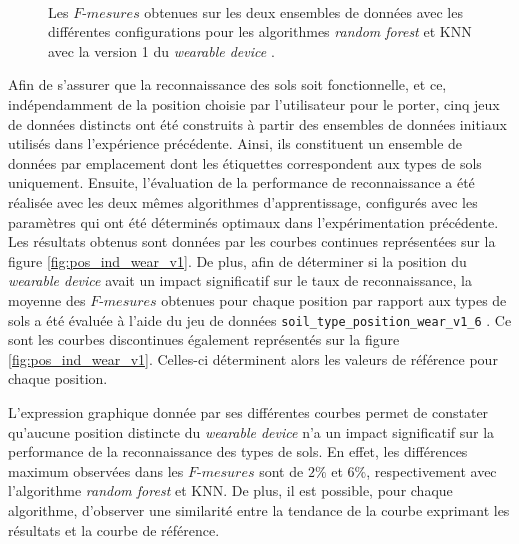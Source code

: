 \begin{figure}[H]
    \centering
    \\[20pt]
    \caption[Les $F\mbox{-} mesures$ obtenues sur les deux ensembles de données avec les différentes configurations pour les algorithmes \textit{random forest} et \acs{KNN} avec la version 1 du \textit{wearable device}.]{Les $F\mbox{-} mesures$ obtenues sur les deux ensembles de données avec les différentes configurations pour les algorithmes \textit{random forest} et \acs{KNN} avec la version 1 du \textit{wearable device} \citep{Thullier2017}.}
    \label{fig:results_wear_v1}
\end{figure}

Afin de s'assurer que la reconnaissance des sols soit fonctionnelle, et ce, indépendamment de la position choisie par l'utilisateur pour le porter, cinq jeux de données distincts ont été construits à partir des ensembles de données initiaux utilisés dans l'expérience précédente. Ainsi, ils constituent un ensemble de données par emplacement dont les étiquettes correspondent aux types de sols uniquement. Ensuite, l'évaluation de la performance de reconnaissance a été réalisée avec les deux mêmes algorithmes d'apprentissage, configurés avec les paramètres qui ont été déterminés optimaux dans l'expérimentation précédente. Les résultats obtenus sont données par les courbes continues représentées sur la figure \ref{fig:pos_ind_wear_v1}. De plus, afin de déterminer si la position du \textit{wearable device} avait un impact significatif sur le taux de reconnaissance, la moyenne des $F\mbox{-}mesures$ obtenues pour chaque position par rapport aux types de sols a été évaluée à l'aide du jeu de données \og \texttt{soil\_type\_position\_wear\_v1\_6} \fg. Ce sont les courbes discontinues également représentés sur la figure \ref{fig:pos_ind_wear_v1}. Celles-ci déterminent alors les valeurs de référence pour chaque position.

L'expression graphique donnée par ses différentes courbes permet de constater qu'aucune position distincte du \textit{wearable device} n'a un impact significatif sur la performance de la reconnaissance des types de sols. En effet, les différences maximum observées dans les $F\mbox{-}mesures$ sont de $2\%$ et $6\%$, respectivement avec l'algorithme \textit{random forest} et \acs{KNN}. De plus, il est possible, pour chaque algorithme, d'observer une similarité entre la tendance de la courbe exprimant les résultats et la courbe de référence.

